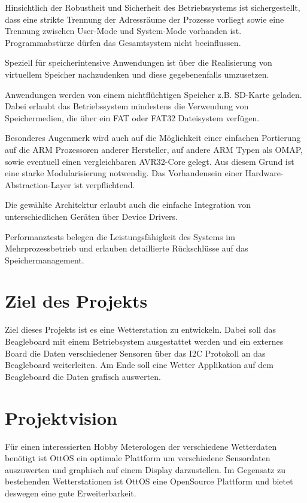 \documentclass[10pt,a4paper,fleqn]{article}
\begin{document}
	Hinsichtlich der Robustheit und Sicherheit des Betriebssystems ist sichergestellt, dass
		eine strikte Trennung der Adressräume der Prozesse vorliegt sowie eine Trennung zwischen
		User-Mode und System-Mode vorhanden ist. Programmabstürze dürfen das Gesamtsystem nicht
		beeinflussen.
		
	Speziell für speicherintensive Anwendungen ist über die Realisierung von virtuellem Speicher
		nachzudenken und diese gegebenenfalls umzusetzen.
		
	Anwendungen werden von einem nichtflüchtigen Speicher z.B. SD-Karte geladen. Dabei erlaubt
		das Betriebssystem mindestens die Verwendung von Speichermedien, die über ein FAT
		oder FAT32 Dateisystem verfügen.
	
	Besonderes Augenmerk wird auch auf die Möglichkeit einer einfachen Portierung auf die ARM
		Prozessoren anderer Hersteller, auf andere ARM Typen als OMAP, sowie eventuell einen
		vergleichbaren AVR32-Core gelegt. Aus diesem Grund ist eine starke Modularisierung
		notwendig. Das Vorhandensein einer Hardware-Abstraction-Layer ist verpflichtend.
		
	Die gewählte Architektur erlaubt auch die einfache Integration von unterschiedlichen
		Geräten über Device Drivers.
			
	Performanztests belegen die Leistungsfähigkeit des Systems im Mehrprozessbetrieb und erlauben
		detaillierte Rückschlüsse auf das Speichermanagement.

\section{Ziel des Projekts}
 	Ziel dieses Projekts ist es eine Wetterstation zu entwickeln. Dabei soll das Beagleboard mit
		einem Betriebsystem ausgestattet werden und ein externes Board die Daten verschiedener
		Sensoren über das I2C Protokoll an das Beagleboard weiterleiten. Am Ende soll eine Wetter
		Applikation auf dem Beagleboard die Daten grafisch auswerten.

\section{Projektvision}
	Für einen interessierten Hobby Meterologen der verschiedene Wetterdaten benötigt ist OttOS ein
		optimale Plattform um verschiedene Sensordaten auszuwerten und graphisch auf einem Display
		darzustellen. Im Gegensatz zu bestehenden Wetterstationen ist OttOS eine OpenSource
		Plattform und bietet deswegen eine gute Erweiterbarkeit.
\end{document}
